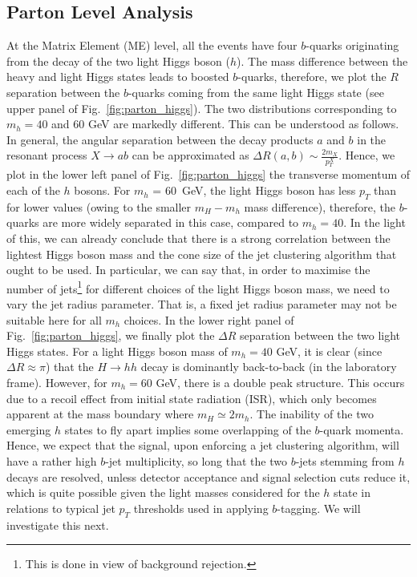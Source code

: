 \documentclass[12pt]{article}
\begin{document}
\subsection{Parton Level Analysis}

At the Matrix Element (ME) level, all the events have four $b$-quarks originating
from the decay of the two light Higgs boson ($h$). The mass difference between
the heavy and light Higgs states leads to boosted $b$-quarks,
therefore, we plot the $R$ separation between the $b$-quarks coming from
the same light Higgs state (see upper panel of Fig.~\ref{fig:parton_higgs}).  The two distributions corresponding to $m_h=40$ and 60 GeV are markedly different. This can be understood as follows.
In general, the angular separation between the decay products $a$ and $b$  in the resonant process
 $X \to a b$ can be approximated as $\Delta R (a,b) \sim \frac{2 m_{X}}{p^{X}_T}$. Hence, we plot in the lower left panel of
Fig.~\ref{fig:parton_higgs} the transverse momentum of each of the $h$ bosons.
For $m_h$ = 60~GeV, the light Higgs boson has less $p_T$ than for lower values (owing to the smaller $m_H-m_h$ mass difference), therefore, the $b$-quarks
are more widely separated in this case, compared to $m_h=40$. In the light of this, we can
already conclude that there is a strong correlation between the lightest Higgs boson mass and
the cone size of the jet clustering algorithm that ought to be used. In particular, we can say  that, in order to maximise the number of jets\footnote{This is done in view of background rejection.} for different choices of the light Higgs boson
mass, we need to vary the jet radius parameter. That is, a fixed jet radius parameter may not
be suitable here for all $m_h$ choices. In the lower right panel of Fig.~\ref{fig:parton_higgs}, we finally plot the
$\Delta R$ separation between the two light Higgs states. For a light Higgs boson mass of $m_h = 40$ GeV, it is clear (since $\Delta R\approx \pi$) that
the $H \to h h $ decay is dominantly back-to-back (in the laboratory frame). However, for $m_h = 60$ GeV,  there is a double peak structure. This occurs due to a recoil effect from initial state radiation (ISR), which only becomes apparent at the mass boundary where $m_H \simeq 2m_h$. The inability of the two emerging $h$ states to fly apart implies some overlapping of
the $b$-quark momenta. Hence, we expect that the signal, upon enforcing  a jet clustering algorithm, will have a rather high $b$-jet multiplicity, so long that the two $b$-jets stemming from $h$ decays are resolved, unless detector acceptance and signal selection cuts reduce it, which is quite possible given the light masses considered for  the $h$ state in relations to typical jet $p_T$ thresholds used in applying $b$-tagging.  We will investigate this next.
\end{document}
